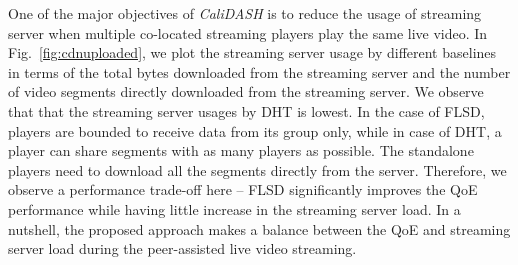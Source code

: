 One of the major objectives of \textit{CaliDASH} is to reduce the usage of streaming server when multiple co-located streaming players play the same live video. In Fig.~\ref{fig:cdnuploaded}, we plot the streaming server usage by different baselines in terms of the total bytes downloaded from the streaming server and the number of video segments directly downloaded from the streaming server. We observe that that the streaming server usages by DHT is lowest. In the case of FLSD, players are bounded to receive data from its group only, while in case of DHT, a player can share segments with as many players as possible. The standalone players need to download all the segments directly from the server. Therefore, we observe a performance trade-off here -- FLSD significantly improves the QoE performance while having little increase in the streaming server load. In a nutshell, the proposed approach makes a balance between the QoE and streaming server load during the peer-assisted live video streaming.  
%
%
%





